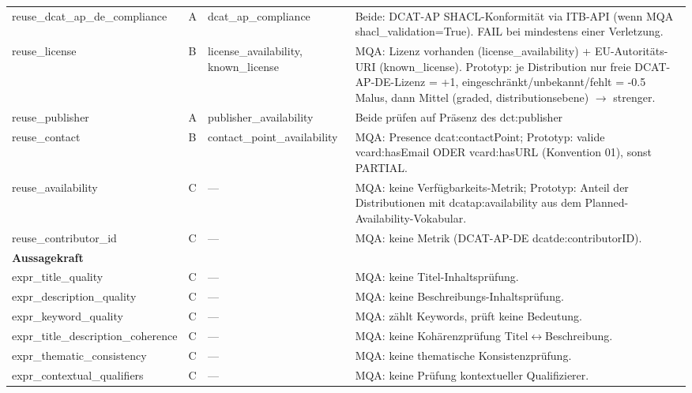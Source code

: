 \begin{longtable}{p{3.1cm} p{0.7cm} p{3.6cm} p{6.8cm}}
reuse\_dcat\_ap\_de\_compliance & A & dcat\_ap\_compliance & Beide: DCAT-AP SHACL-Konformität via ITB-API (wenn MQA shacl\_validation=True). FAIL bei mindestens einer Verletzung. \\

reuse\_license & B & license\_availability, known\_license & MQA: Lizenz vorhanden (license\_availability) + EU-Autoritäts-URI (known\_license). Prototyp: je Distribution nur freie DCAT-AP-DE-Lizenz = +1, eingeschränkt/unbekannt/fehlt = -0.5 Malus, dann Mittel (graded, distributionsebene) $\rightarrow$ strenger. \\

reuse\_publisher & A & publisher\_availability & Beide prüfen auf Präsenz des dct:publisher \\

reuse\_contact & B & contact\_point\_availability & MQA: Presence dcat:contactPoint; Prototyp: valide vcard:hasEmail ODER vcard:hasURL (Konvention 01), sonst PARTIAL. \\

reuse\_availability & C & --- & MQA: keine Verfügbarkeits-Metrik; Prototyp: Anteil der Distributionen mit dcatap:availability aus dem Planned-Availability-Vokabular. \\

reuse\_contributor\_id & C & --- & MQA: keine Metrik (DCAT-AP-DE dcatde:contributorID). \\


\multicolumn{4}{l}{\textbf{Aussagekraft}} \\
\midrule

expr\_title\_quality & C & --- & MQA: keine Titel-Inhaltsprüfung. \\

expr\_description\_quality & C & --- & MQA: keine Beschreibungs-Inhaltsprüfung. \\

expr\_keyword\_quality & C & --- & MQA: zählt Keywords, prüft keine Bedeutung. \\

expr\_title\_description\_coherence & C & --- & MQA: keine Kohärenzprüfung Titel$\leftrightarrow$Beschreibung. \\

expr\_thematic\_consistency & C & --- & MQA: keine thematische Konsistenzprüfung. \\

expr\_contextual\_qualifiers & C & --- & MQA: keine Prüfung kontextueller Qualifizierer. \\


\end{longtable}
\endgroup